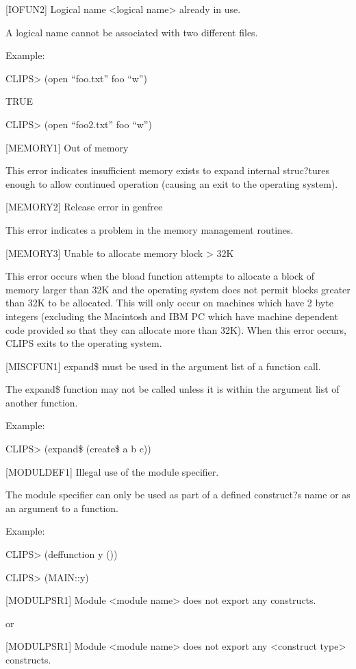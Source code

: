 \documentclass[letterpaper,10pt,english]{sphinxmanual}
\begin{document}
{[}IOFUN2{]} Logical name \textless{}logical name\textgreater{} already in use.

A logical name cannot be associated with two different files.

Example:

CLIPS\textgreater{} (open “foo.txt” foo “w”)

TRUE

CLIPS\textgreater{} (open “foo2.txt” foo “w”)

{[}MEMORY1{]} Out of memory

This error indicates insufficient memory exists to expand internal
struc?tures enough to allow continued operation (causing an exit to the
operating system).

{[}MEMORY2{]} Release error in genfree

This error indicates a problem in the memory management routines.

{[}MEMORY3{]} Unable to allocate memory block \textgreater{} 32K

This error occurs when the bload function attempts to allocate a block
of memory larger than 32K and the operating system does not permit
blocks greater than 32K to be allocated. This will only occur on
machines which have 2 byte integers (excluding the Macintosh and IBM PC
which have machine dependent code provided so that they can allocate
more than 32K). When this error occurs, CLIPS exits to the operating
system.

{[}MISCFUN1{]} expand\$ must be used in the argument list of a function call.

The expand\$ function may not be called unless it is within the argument
list of another function.

Example:

CLIPS\textgreater{} (expand\$ (create\$ a b c))

{[}MODULDEF1{]} Illegal use of the module specifier.

The module specifier can only be used as part of a defined construct?s
name or as an argument to a function.

Example:

CLIPS\textgreater{} (deffunction y ())

CLIPS\textgreater{} (MAIN::y)

{[}MODULPSR1{]} Module \textless{}module name\textgreater{} does not export any constructs.

or

{[}MODULPSR1{]} Module \textless{}module name\textgreater{} does not export any \textless{}construct type\textgreater{}
constructs.
\end{document}
